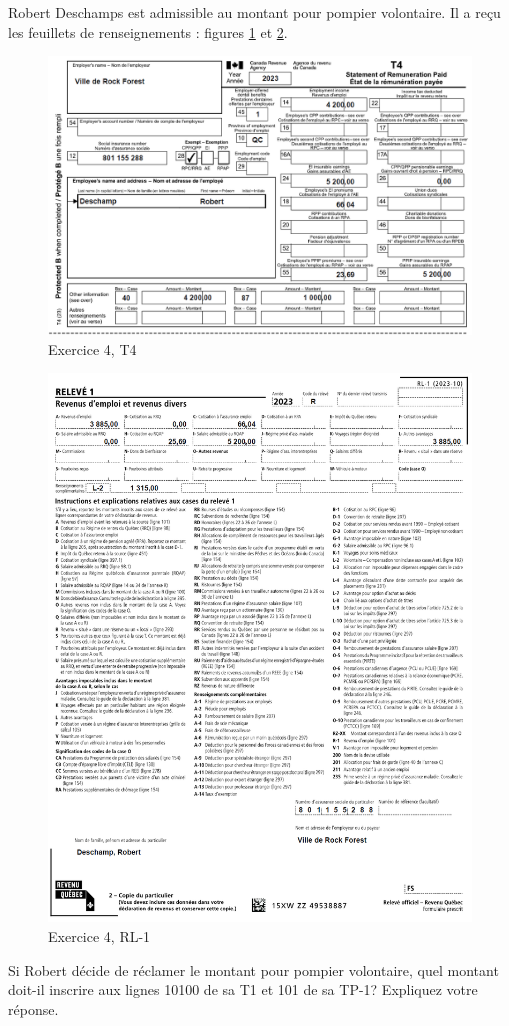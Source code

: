 \begin{question}
	Robert Deschamps est admissible au montant pour pompier volontaire. Il a reçu les feuillets de renseignements : figures \ref{fig:chap3Exercice4T4} et \ref{fig:chap3Exercice4RL1}.
	\begin{figure}
		\centering
		\includegraphics[width=.9\textwidth]{exercice/3-4/Q8/T4.png}
		\caption{Exercice 4, T4}
		\label{fig:chap3Exercice4T4}
	\end{figure}
	\begin{figure}
		\centering
		\includegraphics[width=.9\textwidth]{exercice/3-4/Q8/RL1.png}
		\caption{Exercice 4, RL-1}
		\label{fig:chap3Exercice4RL1}
	\end{figure}
	
	Si Robert décide de réclamer le montant pour pompier volontaire, quel montant doit-il inscrire aux lignes 10100 de sa T1 et 101 de sa
	TP-1? Expliquez votre réponse.
\end{question}
